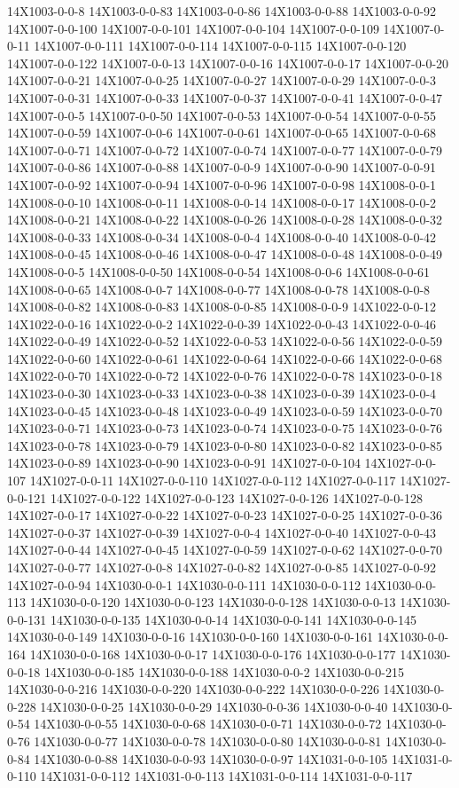 \documentclass[
]{book}
\begin{document}
14X1003-0-0-8 14X1003-0-0-83 14X1003-0-0-86 14X1003-0-0-88 14X1003-0-0-92 14X1007-0-0-100 14X1007-0-0-101 14X1007-0-0-104 14X1007-0-0-109 14X1007-0-0-11 14X1007-0-0-111 14X1007-0-0-114 14X1007-0-0-115 14X1007-0-0-120 14X1007-0-0-122 14X1007-0-0-13 14X1007-0-0-16 14X1007-0-0-17 14X1007-0-0-20 14X1007-0-0-21 14X1007-0-0-25 14X1007-0-0-27 14X1007-0-0-29 14X1007-0-0-3 14X1007-0-0-31 14X1007-0-0-33 14X1007-0-0-37 14X1007-0-0-41 14X1007-0-0-47 14X1007-0-0-5 14X1007-0-0-50 14X1007-0-0-53 14X1007-0-0-54 14X1007-0-0-55 14X1007-0-0-59 14X1007-0-0-6 14X1007-0-0-61 14X1007-0-0-65 14X1007-0-0-68 14X1007-0-0-71 14X1007-0-0-72 14X1007-0-0-74 14X1007-0-0-77 14X1007-0-0-79 14X1007-0-0-86 14X1007-0-0-88 14X1007-0-0-9 14X1007-0-0-90 14X1007-0-0-91 14X1007-0-0-92 14X1007-0-0-94 14X1007-0-0-96 14X1007-0-0-98 14X1008-0-0-1 14X1008-0-0-10 14X1008-0-0-11 14X1008-0-0-14 14X1008-0-0-17 14X1008-0-0-2 14X1008-0-0-21 14X1008-0-0-22 14X1008-0-0-26 14X1008-0-0-28 14X1008-0-0-32 14X1008-0-0-33 14X1008-0-0-34 14X1008-0-0-4 14X1008-0-0-40 14X1008-0-0-42 14X1008-0-0-45 14X1008-0-0-46 14X1008-0-0-47 14X1008-0-0-48 14X1008-0-0-49 14X1008-0-0-5 14X1008-0-0-50 14X1008-0-0-54 14X1008-0-0-6 14X1008-0-0-61 14X1008-0-0-65 14X1008-0-0-7 14X1008-0-0-77 14X1008-0-0-78 14X1008-0-0-8 14X1008-0-0-82 14X1008-0-0-83 14X1008-0-0-85 14X1008-0-0-9 14X1022-0-0-12 14X1022-0-0-16 14X1022-0-0-2 14X1022-0-0-39 14X1022-0-0-43 14X1022-0-0-46 14X1022-0-0-49 14X1022-0-0-52 14X1022-0-0-53 14X1022-0-0-56 14X1022-0-0-59 14X1022-0-0-60 14X1022-0-0-61 14X1022-0-0-64 14X1022-0-0-66 14X1022-0-0-68 14X1022-0-0-70 14X1022-0-0-72 14X1022-0-0-76 14X1022-0-0-78 14X1023-0-0-18 14X1023-0-0-30 14X1023-0-0-33 14X1023-0-0-38 14X1023-0-0-39 14X1023-0-0-4 14X1023-0-0-45 14X1023-0-0-48 14X1023-0-0-49 14X1023-0-0-59 14X1023-0-0-70 14X1023-0-0-71 14X1023-0-0-73 14X1023-0-0-74 14X1023-0-0-75 14X1023-0-0-76 14X1023-0-0-78 14X1023-0-0-79 14X1023-0-0-80 14X1023-0-0-82 14X1023-0-0-85 14X1023-0-0-89 14X1023-0-0-90 14X1023-0-0-91 14X1027-0-0-104 14X1027-0-0-107 14X1027-0-0-11 14X1027-0-0-110 14X1027-0-0-112 14X1027-0-0-117 14X1027-0-0-121 14X1027-0-0-122 14X1027-0-0-123 14X1027-0-0-126 14X1027-0-0-128 14X1027-0-0-17 14X1027-0-0-22 14X1027-0-0-23 14X1027-0-0-25 14X1027-0-0-36 14X1027-0-0-37 14X1027-0-0-39 14X1027-0-0-4 14X1027-0-0-40 14X1027-0-0-43 14X1027-0-0-44 14X1027-0-0-45 14X1027-0-0-59 14X1027-0-0-62 14X1027-0-0-70 14X1027-0-0-77 14X1027-0-0-8 14X1027-0-0-82 14X1027-0-0-85 14X1027-0-0-92 14X1027-0-0-94 14X1030-0-0-1 14X1030-0-0-111 14X1030-0-0-112 14X1030-0-0-113 14X1030-0-0-120 14X1030-0-0-123 14X1030-0-0-128 14X1030-0-0-13 14X1030-0-0-131 14X1030-0-0-135 14X1030-0-0-14 14X1030-0-0-141 14X1030-0-0-145 14X1030-0-0-149 14X1030-0-0-16 14X1030-0-0-160 14X1030-0-0-161 14X1030-0-0-164 14X1030-0-0-168 14X1030-0-0-17 14X1030-0-0-176 14X1030-0-0-177 14X1030-0-0-18 14X1030-0-0-185 14X1030-0-0-188 14X1030-0-0-2 14X1030-0-0-215 14X1030-0-0-216 14X1030-0-0-220 14X1030-0-0-222 14X1030-0-0-226 14X1030-0-0-228 14X1030-0-0-25 14X1030-0-0-29 14X1030-0-0-36 14X1030-0-0-40 14X1030-0-0-54 14X1030-0-0-55 14X1030-0-0-68 14X1030-0-0-71 14X1030-0-0-72 14X1030-0-0-76 14X1030-0-0-77 14X1030-0-0-78 14X1030-0-0-80 14X1030-0-0-81 14X1030-0-0-84 14X1030-0-0-88 14X1030-0-0-93 14X1030-0-0-97 14X1031-0-0-105 14X1031-0-0-110 14X1031-0-0-112 14X1031-0-0-113 14X1031-0-0-114 14X1031-0-0-117 
\end{document}
